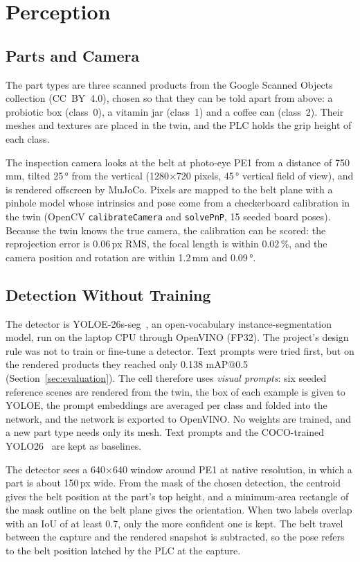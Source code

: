 \section{Perception}\label{sec:perception}

\subsection{Parts and Camera}

The part types are three scanned products from the Google Scanned Objects collection (CC~BY~4.0),
chosen so that they can be told apart from above: a probiotic box (class~0), a vitamin jar
(class~1) and a coffee can (class~2). Their meshes and textures are placed in the twin, and the
PLC holds the grip height of each class.

The inspection camera looks at the belt at photo-eye PE1 from a distance of 750\,mm, tilted
25\,° from the vertical (1280$\times$720 pixels, 45\,° vertical field of view), and is rendered
offscreen by MuJoCo. Pixels are mapped to the belt plane with a pinhole model whose intrinsics
and pose come from a checkerboard calibration in the twin (OpenCV \texttt{calibrateCamera} and
\texttt{solvePnP}, 15 seeded board poses). Because the twin knows the true camera, the calibration
can be scored: the reprojection error is 0.06\,px RMS, the focal length is within 0.02\,\%, and
the camera position and rotation are within 1.2\,mm and 0.09\,°.

\subsection{Detection Without Training}

The detector is YOLOE-26s-seg~\cite{Wang2025yoloe,Sapkota2026yoloe26}, an open-vocabulary
instance-segmentation model, run on the laptop CPU through OpenVINO (FP32). The project's design
rule was not to train or fine-tune a detector. Text prompts were tried first, but on the rendered
products they reached only 0.138 mAP@0.5 (Section~\ref{sec:evaluation}). The cell therefore uses
\emph{visual prompts}: six seeded reference scenes are rendered from the twin, the box of each
example is given to YOLOE, the prompt embeddings are averaged per class and folded into the
network, and the network is exported to OpenVINO. No weights are trained, and a new part type
needs only its mesh. Text prompts and the COCO-trained YOLO26~\cite{Ultralytics2026yolo26} are
kept as baselines.

The detector sees a 640$\times$640 window around PE1 at native resolution, in which a part is
about 150\,px wide. From the mask of the chosen detection, the centroid gives the belt position
at the part's top height, and a minimum-area rectangle of the mask outline on the belt plane gives
the orientation. When two labels overlap with an IoU of at least 0.7, only the more confident
one is kept. The belt travel between the capture and the rendered snapshot is subtracted, so
the pose refers to the belt position latched by the PLC at the capture.

